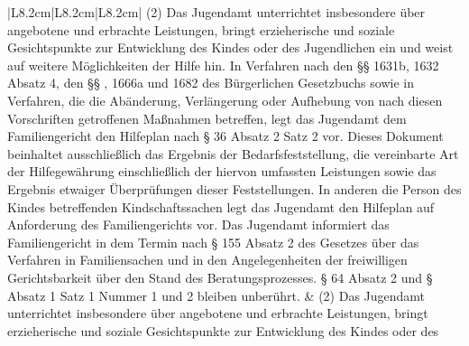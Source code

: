 \documentclass[10pt,a4paper,landscape]{article}
\begin{document}
\begin{longtable}{|L{8.2cm}|L{8.2cm}|L{8.2cm}|}
(2) Das Jugendamt unterrichtet  \newline insbesondere über angebotene und  \newline erbrachte Leistungen, bringt erzieherische  \newline und soziale Gesichtspunkte zur  \newline Entwicklung des Kindes oder des  \newline Jugendlichen ein und weist auf weitere  \newline Möglichkeiten der Hilfe hin. In Verfahren  \newline nach den \S{}\S{} 1631b, 1632 Absatz 4, den \S{}\S{}  , 1666a und 1682 des Bürgerlichen  \newline Gesetzbuchs sowie in Verfahren, die die  \newline Abänderung, Verlängerung oder  \newline Aufhebung von nach diesen Vorschriften  \newline getroffenen Maßnahmen betreffen, legt das  \newline Jugendamt dem Familiengericht den  \newline \textcolor{diffred}{Hilfeplan} nach \S{} \textcolor{diffred}{36} Absatz \textcolor{diffred}{2} Satz 2 vor.  \newline Dieses Dokument beinhaltet ausschließlich  \newline das Ergebnis der Bedarfsfeststellung, die  \newline vereinbarte Art der Hilfegewährung  \newline einschließlich der hiervon umfassten  \newline Leistungen sowie das Ergebnis etwaiger  \newline Überprüfungen dieser Feststellungen. In  \newline anderen die Person des Kindes  \newline betreffenden Kindschaftssachen legt das  \newline Jugendamt den Hilfeplan auf Anforderung  \newline des Familiengerichts vor. Das Jugendamt  \newline informiert das Familiengericht in dem  \newline Termin nach \S{} 155 Absatz 2 des Gesetzes  \newline über das Verfahren in Familiensachen und  \newline in den Angelegenheiten der freiwilligen  \newline Gerichtsbarkeit über den Stand des  \newline Beratungsprozesses. \S{} 64 Absatz 2 und \S{}   Absatz 1 Satz 1 Nummer 1 und 2  \newline bleiben unberührt. & (2) Das Jugendamt unterrichtet  \newline insbesondere über angebotene und  \newline erbrachte Leistungen, bringt erzieherische  \newline und soziale Gesichtspunkte zur  \newline Entwicklung des Kindes oder des  
\end{longtable}
\end{document}
